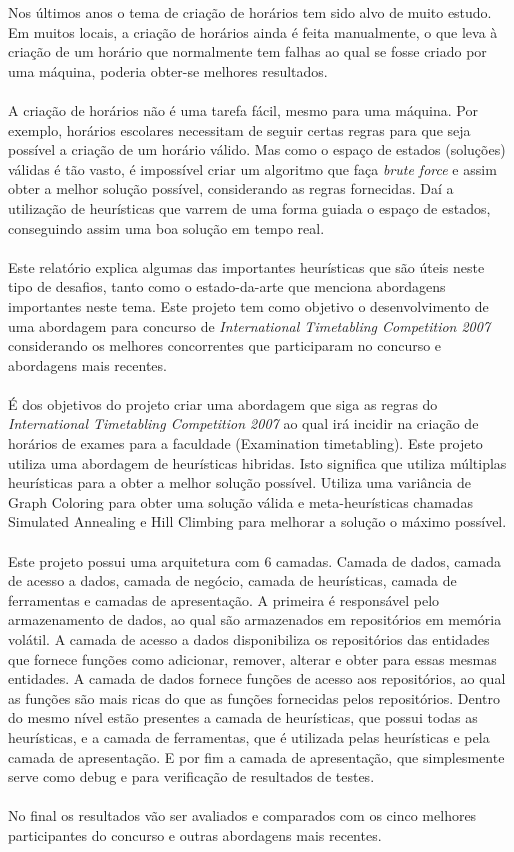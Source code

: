 Nos últimos anos o tema de criação de horários tem sido alvo de muito estudo. Em muitos locais, a criação de horários ainda é feita manualmente, o que leva à criação de um horário que normalmente tem falhas ao qual se fosse criado por uma máquina, poderia obter-se melhores resultados.\\
\\
A criação de horários não é uma tarefa fácil, mesmo para uma máquina. Por exemplo, horários escolares necessitam de seguir certas regras para que seja possível a criação de um horário válido. Mas como o espaço de estados (soluções) válidas é tão vasto, é impossível criar um algoritmo que faça \textit{brute force} e assim obter a melhor solução possível, considerando as regras fornecidas. Daí a utilização de heurísticas que varrem de uma forma guiada o espaço de estados, conseguindo assim uma boa solução em tempo real.\\
\\
Este relatório explica algumas das importantes heurísticas que são úteis neste tipo de desafios, tanto como o estado-da-arte que menciona abordagens importantes neste tema. Este projeto tem como objetivo o desenvolvimento de uma abordagem para concurso de \textit{International Timetabling Competition 2007} considerando os melhores concorrentes que participaram no concurso e abordagens mais recentes.\\
\\
É dos objetivos do projeto criar uma abordagem que siga as regras do \textit{International Timetabling Competition 2007} ao qual irá incidir na criação de horários de exames para a faculdade (Examination timetabling). Este projeto utiliza uma abordagem de heurísticas hibridas. Isto significa que utiliza múltiplas heurísticas para a obter a melhor solução possível. Utiliza uma variância de Graph Coloring para obter uma solução válida e meta-heurísticas chamadas Simulated Annealing e Hill Climbing para melhorar a solução o máximo possível.\\
\\
Este projeto possui uma arquitetura com 6 camadas. Camada de dados, camada de acesso a dados, camada de negócio, camada de heurísticas, camada de ferramentas e camadas de apresentação. A primeira é responsável pelo armazenamento de dados, ao qual são armazenados em repositórios em memória volátil. A camada de acesso a dados disponibiliza os repositórios das entidades que fornece funções como adicionar, remover, alterar e obter para essas mesmas entidades. A camada de dados fornece funções de acesso aos repositórios, ao qual as funções são mais ricas do que as funções fornecidas pelos repositórios. Dentro do mesmo nível estão presentes a camada de heurísticas, que possui todas as heurísticas, e a camada de ferramentas, que é utilizada pelas heurísticas e pela camada de apresentação. E por fim a camada de apresentação, que simplesmente serve como debug e para verificação de resultados de testes.\\
\\
No final os resultados vão ser avaliados e comparados com os cinco melhores participantes do concurso e outras abordagens mais recentes.
\
